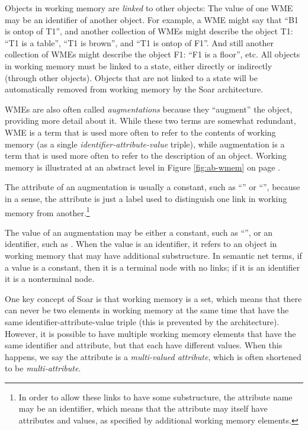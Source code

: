 Objects in working memory are \emph{linked} to other objects: The value of one WME may be an identifier of another object. For example, a WME might say that ``B1 is ontop of T1'', and another collection of WMEs might describe the object T1: ``T1 is a table'', ``T1 is brown'', and ``T1 is ontop of F1''. And still another collection of WMEs might describe the object F1: ``F1 is a floor'', etc. All objects in working memory must be linked to a state, either directly or indirectly (through other objects). Objects that are not linked to a state will be automatically removed from working memory by the Soar architecture. 

WMEs are also often called \textit{augmentations} because they ``augment'' the object, providing more detail about it. While these two terms are somewhat redundant, WME is a term that is used more often to refer to the contents of working memory (as a single \textit{identifier-attribute-value} triple), while augmentation is a term that is used more often to refer to the description of an object. Working memory is illustrated at an abstract level in Figure \ref{fig:ab-wmem} on page \pageref{fig:ab-wmem}. 

The attribute of an augmentation is usually a constant, such as ``'' or ``'', because in a sense, the attribute is just a label used to distinguish one link in working memory from another.\footnote{
	In order to allow these links to have some substructure, the attribute name may be an identifier, which means that the attribute may itself have attributes and values, as specified by additional working memory elements.
}

The value of an augmentation may be either a constant, such as ``'', or an identifier, such as . When the value is an identifier, it refers to an object in working memory that may have additional substructure. In semantic net terms, if a value is a constant, then it is a terminal node with no links; if it is an identifier it is a nonterminal node.

One key concept of Soar is that working memory is a set, which means that there can never be two elements in working memory at the same time that have the same identifier-attribute-value triple (this is prevented by the architecture). However, it is possible to have multiple working memory elements that have the same identifier and attribute, but that each have different values.  When this happens, we say the attribute is a \emph{multi-valued attribute}, which is often shortened to be \emph{multi-attribute}.

